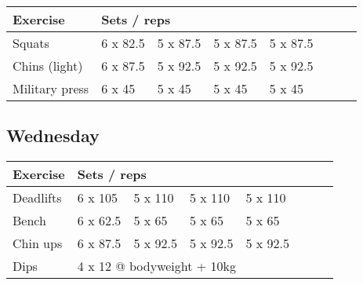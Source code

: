 \documentclass[12pt, a4paper]{article}%
\begin{document}
  \begin{tabular}{l|lllllll}
  \hspace{0.75em} \textbf{Exercise} & \multicolumn{ 7 }{l}{ \textbf{Sets / reps} } \\ \hline

            \hspace{0.75em} Squats
            & 6 x 82.5
            & 5 x 87.5
            & 5 x 87.5
            & 5 x 87.5
            & 
            & 
            & 
            \\


            \hspace{0.75em} Chins (light)
            & 6 x 87.5
            & 5 x 92.5
            & 5 x 92.5
            & 5 x 92.5
            & 
            & 
            & 
            \\


            \hspace{0.75em} Military press
            & 6 x 45
            & 5 x 45
            & 5 x 45
            & 5 x 45
            & 
            & 
            & 
            \\


  \end{tabular}

  \subsection*{\hspace{0.5em} Wednesday }


  \begin{tabular}{l|lllllll}
  \hspace{0.75em} \textbf{Exercise} & \multicolumn{ 7 }{l}{ \textbf{Sets / reps} } \\ \hline

            \hspace{0.75em} Deadlifts
            & 6 x 105
            & 5 x 110
            & 5 x 110
            & 5 x 110
            & 
            & 
            & 
            \\


            \hspace{0.75em} Bench
            & 6 x 62.5
            & 5 x 65
            & 5 x 65
            & 5 x 65
            & 
            & 
            & 
            \\


            \hspace{0.75em} Chin ups
            & 6 x 87.5
            & 5 x 92.5
            & 5 x 92.5
            & 5 x 92.5
            & 
            & 
            & 
            \\


   \hspace{0.75em} Dips &  \multicolumn{ 7 }{l}{ 4 x 12 @ bodyweight + 10kg } \\
  \end{tabular}
\end{document}
